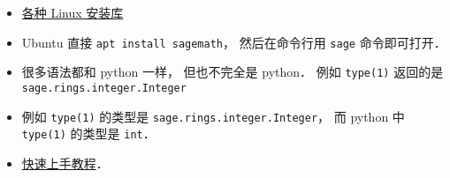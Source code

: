 
\begin{issues}
\issueDraft
\end{issues}

\begin{itemize}
\item \href{https://repology.org/project/sagemath/versions}{各种 Linux 安装库}
\item Ubuntu 直接 \verb|apt install sagemath|， 然后在命令行用 \verb|sage| 命令即可打开．
\item 很多语法都和 python 一样， 但也不完全是 python． 例如 \verb|type(1)| 返回的是 \verb|sage.rings.integer.Integer|
\item 例如 \verb|type(1)| 的类型是 \verb|sage.rings.integer.Integer|， 而 python 中 \verb|type(1)| 的类型是 \verb|int|．
\item \href{https://www.sagemath.org/tour-quickstart.html}{快速上手教程}．
\end{itemize}
